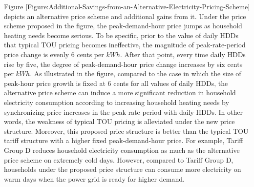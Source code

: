 Figure \ref{Figure:Additional-Savings-from-an-Alternative-Electricity-Pricing-Scheme} depicts an alternative price scheme and additional gains from it. Under the price scheme proposed in the figure, the peak-demand-hour price jumps as household heating needs become serious. To be specific, prior to the value of daily HDDs that typical TOU pricing becomes ineffective, the magnitude of peak-rate-period price change is evenly 6 cents per $kWh$. After that point, every time daily HDDs rise by five, the degree of peak-demand-hour price change increases by six cents per $kWh$. As illustrated in the figure, compared to the case in which the size of peak-hour price growth is fixed at 6 cents for all values of daily HDDs, the alternative price scheme can induce a more significant reduction in household electricity consumption according to increasing household heating needs by synchronizing price increases in the peak rate period with daily HDDs. In other words, the weakness of typical TOU pricing is alleviated under the new price structure. Moreover, this proposed price structure is better than the typical TOU tariff structure with a higher fixed peak-demand-hour price. For example, Tariff Group D reduces household electricity consumption as much as the alternative price scheme on extremely cold days. However, compared to Tariff Group D, households under the proposed price structure can consume more electricity on warm days when the power grid is ready for higher demand.
